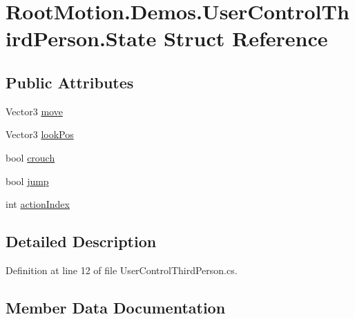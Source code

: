 \hypertarget{struct_root_motion_1_1_demos_1_1_user_control_third_person_1_1_state}{}\section{Root\+Motion.\+Demos.\+User\+Control\+Third\+Person.\+State Struct Reference}
\label{struct_root_motion_1_1_demos_1_1_user_control_third_person_1_1_state}
\subsection*{Public Attributes}
\begin{DoxyCompactItemize}
\item 
Vector3 \mbox{\hyperlink{struct_root_motion_1_1_demos_1_1_user_control_third_person_1_1_state_a7fab291dc547699f29f28a65ce489182}{move}}
\item 
Vector3 \mbox{\hyperlink{struct_root_motion_1_1_demos_1_1_user_control_third_person_1_1_state_a2a6cdcaaa3ba368def6b4c3e3b923989}{look\+Pos}}
\item 
bool \mbox{\hyperlink{struct_root_motion_1_1_demos_1_1_user_control_third_person_1_1_state_ae0b135cfe3583e18a3b0f4fdafe0e9c8}{crouch}}
\item 
bool \mbox{\hyperlink{struct_root_motion_1_1_demos_1_1_user_control_third_person_1_1_state_ae3457f698f62d175369b29c798465b97}{jump}}
\item 
int \mbox{\hyperlink{struct_root_motion_1_1_demos_1_1_user_control_third_person_1_1_state_ac0667969353c25ef2e4da1ab4d0f9d2d}{action\+Index}}
\end{DoxyCompactItemize}


\subsection{Detailed Description}


Definition at line 12 of file User\+Control\+Third\+Person.\+cs.



\subsection{Member Data Documentation}
\mbox{\label{struct_root_motion_1_1_demos_1_1_user_control_third_person_1_1_state_ac0667969353c25ef2e4da1ab4d0f9d2d}} 
